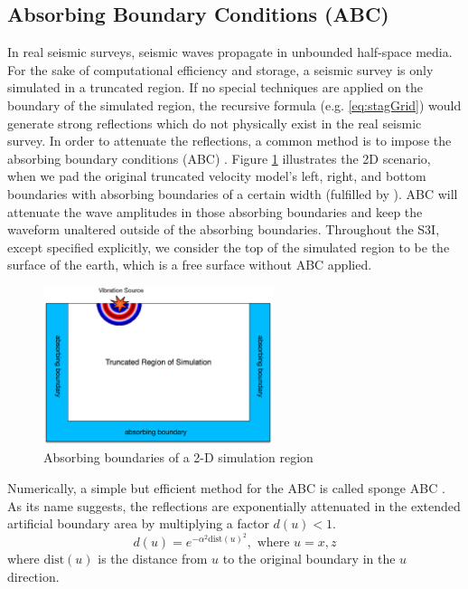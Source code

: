 \documentclass[11pt,titlepage]{article}
\theoremstyle{plain}
\theoremstyle{definition}
\theoremstyle{remark}
\numberwithin{equation}{section}
\begin{document}
\subsection{Absorbing Boundary Conditions (ABC)}
In real seismic surveys, seismic waves propagate in unbounded half-space media. For the sake of computational efficiency and storage, a seismic survey is only simulated in a truncated region. If no special techniques are applied on the boundary of the simulated region, the recursive formula (e.g. \eqref{eq:stagGrid}) would generate strong reflections which do not physically exist in the real seismic survey. In order to attenuate the reflections, a common method is to impose the absorbing boundary conditions (ABC) \cite{Engquist:1977aa, Clayton:1977aa}. Figure \ref{fig:ABC} illustrates the 2D scenario, when we pad the original truncated velocity model's left, right, and bottom boundaries with absorbing boundaries of a certain width (fulfilled by ). ABC will attenuate the wave amplitudes in those absorbing boundaries and keep the waveform unaltered outside of the absorbing boundaries. Throughout the S3I, except specified explicitly, we consider the top of the simulated region to be the surface of the earth, which is a free surface without ABC applied.

\begin{figure}[htbp]
\centering
\includegraphics[width=0.6\textwidth]{Fig/ABC}
\caption{Absorbing boundaries of a 2-D simulation region}
\label{fig:ABC}
\end{figure}

Numerically, a simple but efficient method for the ABC is called sponge ABC \cite{Cerjan:1985aa}. As its name suggests, the reflections are exponentially attenuated in the extended artificial boundary area by multiplying a factor $d(u) < 1$.
\begin{equation}
d(u) = e^{-\alpha^2\text{dist}(u)^2}, \mbox{  where  } u=x, z
\end{equation}
where $\text{dist}(u)$ is the distance from $u$ to the original boundary in the $u$ direction. 
\end{document}
